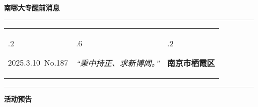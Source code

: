 \documentclass[letterpaper, 12pt]{article}
\begin{document}
\begin{center}
    \Huge\textbf{南哪大专醒前消息}
\end{center}
\vspace{4mm}
\hrule
\renewcommand\tabularxcolumn[1]{m{#1}}
\begin{tabularx}{\textwidth}{>{\hsize.2\hsize}X>{\hsize.6\hsize}X>{\hsize.2\hsize}X}
    \begin{flushleft}
        2025.3.10\, No.187
    \end{flushleft}
    &
    \begin{center}
        \textit{“秉中持正、求新博闻。”}
    \end{center}
    &
    \begin{flushright}
        \textbf{南京市栖霞区}
    \end{flushright}
\end{tabularx}
\vspace{-3.5mm}
\hrule
\vspace{4mm}
\centerline{\huge\textbf{活动预告}}
\end{document}
